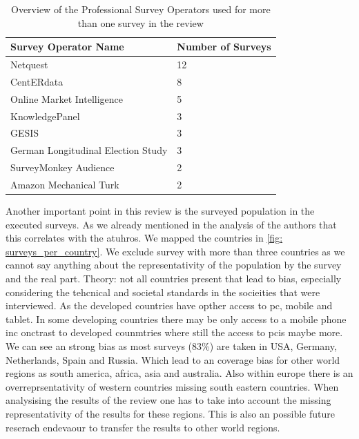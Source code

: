 \begin{table}
	\centering
	\begin{tabular}{ll}
		\toprule
		Survey Operator Name & Number of Surveys \\
		\midrule
        Netquest & 12\\
        CentERdata &8\\
        Online Market Intelligence &5\\
        KnowledgePanel  &3\\
        GESIS &3\\
        German Longitudinal Election Study &3\\
        SurveyMonkey Audience  &2\\
        Amazon Mechanical Turk & 2\\
		\bottomrule 
	\end{tabular}
	\caption{Overview of the Professional Survey Operators used for more than one survey in the review}
	\label{tab: author}
\end{table}


Another important point in this review is the surveyed population in the executed surveys. As we already mentioned in the analysis of the authors that this correlates with the atuhros. We mapped the countries in \ref{fig: surveys_per_country}. We exclude survey with more than three countries as we cannot say anything about the representativity of the population by the survey and the real part. Theory: not all countries present that lead to bias, especially considering the tehcnical and societal standards in the socieities that were interviewed. As the developed countries have opther access to pc, mobile and tablet. In some developing countries there may be only access to a mobile phone inc onctrast to developed counmtries where still the access to pcis maybe more.  We can see an strong bias as most surveys (83\%) are taken in USA, Germany, Netherlands, Spain and Russia. Which lead to an coverage bias for other world regions as south america, africa, asia and australia. Also within europe there is an overreprsentativity of western countries missing south eastern countries. When analysising the results of the review one has to take into account the missing representativity of the results for these regions. This is also an possible future reserach endevaour to transfer the results to other world regions.

